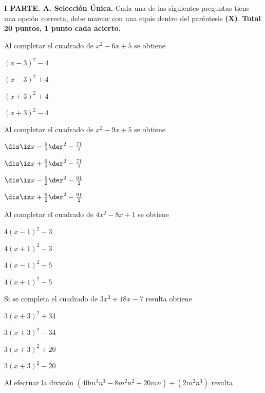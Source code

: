 \documentclass[12pt, fleqn]{article}
\begin{document}
\sf

\setcounter{page}{2} 

\vspace{-2cm}
{\bf I PARTE. A. Selección Única.} Cada una de las siguientes preguntas tiene una opción correcta, debe marcar con una equis dentro del paréntesis {\bf (X)}. {\bf Total 20 puntos, 1 punto cada acierto.}
\vp

\benu
\item Al completar el cuadrado de  $x^2-6x+5$ se obtiene \vp

\benu
\item[] \opc $(x-3)^2-4$
\item[] \opc $(x-3)^2+4$
\item[] \opc $(x+3)^2+4$
\item[] \opc $(x+3)^2-4$
\eenu
\vs

\item Al completar el cuadrado de  $x^2-9x+5$ se obtiene \vp

\benu
\item[] \opc $\dis\iz x-\frac92\der^2-\frac{71}{2}$
\item[] \opc $\dis\iz x+\frac92\der^2-\frac{71}{2}$
\item[] \opc $\dis\iz x-\frac92\der^2-\frac{91}{2}$
\item[] \opc $\dis\iz x+\frac92\der^2-\frac{91}{2}$
\eenu
\vs

\item Al completar el cuadrado de  $4x^2-8x+1$ se obtiene \vp

\benu
\item[] \opc $4(x-1)^2-3$
\item[] \opc $4(x+1)^2-3$
\item[] \opc $4(x-1)^2-5$
\item[] \opc $4(x+1)^2-5$
\eenu
\vs

\item Si se completa el cuadrado de $3x^2+18x-7$ resulta obtiene \vp

\benu
\item[] \opc $3(x+3)^2+34$
\item[] \opc $3(x+3)^2-34$
\item[] \opc $3(x+3)^2+20$
\item[] \opc $3(x+3)^2-20$
\eenu
\vs

\pagebreak

\item Al efectuar la división $(40m^3n^3-8m^2n^2+20mn) \div (2m^2n^3)$ resulta
\vp
\end{document}
